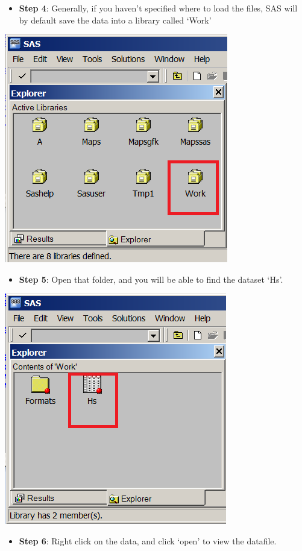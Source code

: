 \documentclass[
]{book}
\providecommand{\tightlist}{%
  \setlength{\itemsep}{0pt}\setlength{\parskip}{0pt}}
\begin{document}
\begin{itemize}
\tightlist
\item
  \textbf{Step 4}: Generally, if you haven't specified where to load the files, SAS will by default save the data into a library called `Work'
\end{itemize}

\includegraphics[width=0.65\linewidth]{images/abacus17}

\begin{itemize}
\tightlist
\item
  \textbf{Step 5}: Open that folder, and you will be able to find the dataset `Hs'.
\end{itemize}

\includegraphics[width=0.65\linewidth]{images/abacus18}

\begin{itemize}
\tightlist
\item
  \textbf{Step 6}: Right click on the data, and click `open' to view the datafile.
\end{itemize}
\end{document}
